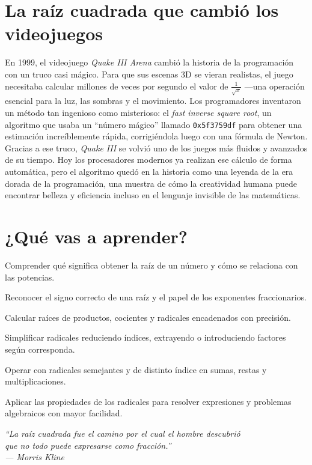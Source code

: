 \section*{La raíz cuadrada que cambió los videojuegos}
\begin{reseñaplana}
En 1999, el videojuego \textit{Quake III Arena} cambió la historia de la programación con un truco casi mágico. 
Para que sus escenas 3D se vieran realistas, el juego necesitaba calcular millones de veces por segundo el valor 
de $ \frac{1}{\sqrt{x}} $ —una operación esencial para la luz, las sombras y el movimiento. Los programadores 
inventaron un método tan ingenioso como misterioso: el \textit{fast inverse square root}, un algoritmo que usaba 
un ``número mágico'' llamado \texttt{0x5f3759df} para obtener una estimación increíblemente rápida, corrigiéndola 
luego con una fórmula de Newton.  
Gracias a ese truco, \textit{Quake III} se volvió uno de los juegos más fluidos y avanzados de su tiempo. 
Hoy los procesadores modernos ya realizan ese cálculo de forma automática, pero el algoritmo quedó en la historia 
como una leyenda de la era dorada de la programación, una muestra de cómo la creatividad humana puede encontrar belleza
y eficiencia incluso en el lenguaje invisible de las matemáticas.
\end{reseñaplana}
\section*{¿Qué vas a aprender?}
\begin{aprende}
  \item Comprender qué significa obtener la raíz de un número y cómo se relaciona con las potencias.  
  \item Reconocer el signo correcto de una raíz y el papel de los exponentes fraccionarios.  
  \item Calcular raíces de productos, cocientes y radicales encadenados con precisión.  
  \item Simplificar radicales reduciendo índices, extrayendo o introduciendo factores según corresponda.  
  \item Operar con radicales semejantes y de distinto índice en sumas, restas y multiplicaciones.  
  \item Aplicar las propiedades de los radicales para resolver expresiones y problemas algebraicos con mayor facilidad.  
\end{aprende}
\vspace{1.5cm} %
\begin{flushright}
  {\fontsize{12}{14}\selectfont\itshape
  ``La raíz cuadrada fue el camino por el cual el hombre descubrió\\ 
  que no todo puede expresarse como fracción.''\\[6pt]
  — Morris Kline}%
\end{flushright}
